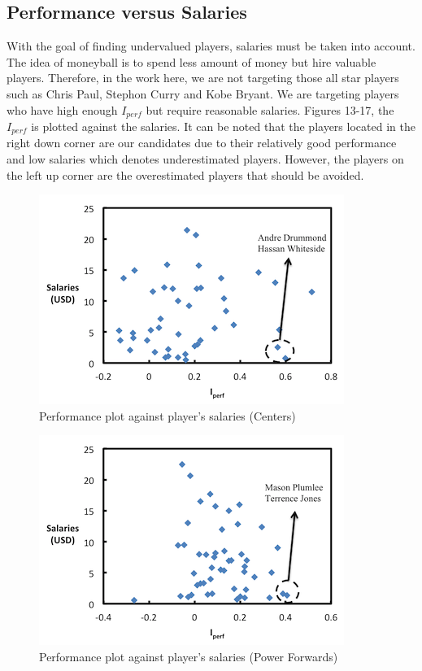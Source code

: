 \documentclass{acm_proc_article-sp}
\begin{document}
\subsection{Performance versus Salaries}
\vspace{0.5em}
With the goal of finding undervalued players, salaries must be taken into account. The idea of moneyball is to spend less amount of money but hire valuable players. Therefore, in the work here, we are not targeting those all star players such as Chris Paul, Stephon Curry and Kobe Bryant. We are targeting players who have high enough  $I_{perf}$  but require reasonable salaries. Figures 13-17, the  $I_{perf}$  is plotted against the salaries. It can be noted that the players located in the right down corner are our candidates due to their relatively good performance and low salaries which denotes underestimated players. However, the players on the left up corner are the overestimated players that should be avoided. 

\begin{figure}[!htb]
\centering
\includegraphics{Fig-14.png}
\caption{Performance plot against player's salaries (Centers)}
\end{figure}

\begin{figure}[!htb]
\centering
\includegraphics{Fig-15.png}
\caption{Performance plot against player's salaries (Power Forwards)}
\end{figure}
\end{document}
